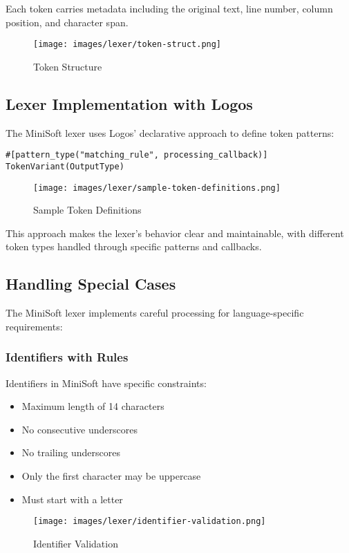 \documentclass[12pt,a4paper]{article}
\begin{document}
Each token carries metadata including the original text, line number, column position, and character span.


\begin{figure}[H]
	\centering
	\texttt{[image: images/lexer/token-struct.png]}
	\caption{Token Structure}
\end{figure}

\subsection{Lexer Implementation with Logos}
The MiniSoft lexer uses Logos' declarative approach to define token patterns:

\begin{lstlisting}[caption={Logos Token Definitions Syntax}]
#[pattern_type("matching_rule", processing_callback)]
TokenVariant(OutputType)
\end{lstlisting}


\begin{figure}[H]
	\centering
	\texttt{[image: images/lexer/sample-token-definitions.png]}
	\caption{Sample Token Definitions}
\end{figure}

This approach makes the lexer's behavior clear and maintainable, with different token types handled through specific patterns and callbacks.

\subsection{Handling Special Cases}
The MiniSoft lexer implements careful processing for language-specific requirements:

\subsubsection{Identifiers with Rules}
Identifiers in MiniSoft have specific constraints:
\begin{itemize}
	\item Maximum length of 14 characters
	\item No consecutive underscores
	\item No trailing underscores
	\item Only the first character may be uppercase
	\item Must start with a letter
\end{itemize}


\begin{figure}[H]
	\centering
	\texttt{[image: images/lexer/identifier-validation.png]}
	\caption{Identifier Validation}
\end{figure}
\end{document}
